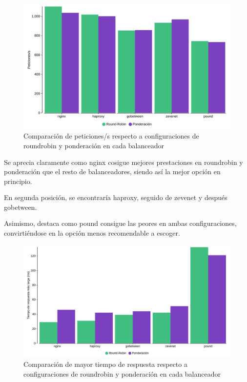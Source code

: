 \begin{figure}[h!]
\begin{center}
\caption{Comparación de peticiones/s respecto a configuraciones de roundrobin y ponderación en cada balanceador}
\label{graf_pet}
\includegraphics[scale=0.05]{peticioness}
\end{center}
\end{figure}

Se aprecia claramente como nginx cosigue mejores prestaciones en roundrobin y ponderación que el resto de balanceadores, siendo así la mejor opción en principio.

En segunda posición, se encontraría haproxy, seguido de zevenet y después gobetween.

Asimismo, destaca como pound consigue las peores en ambas configuraciones, convirtiéndose en la opción menos recomendable a escoger.

\begin{figure}[h!]
\begin{center}
\caption{Comparación de mayor tiempo de respuesta respecto a configuraciones de roundrobin y ponderación en cada balanceador}
\label{graf_tiem}
\includegraphics[scale=0.05]{longest}
\end{center}
\end{figure}

